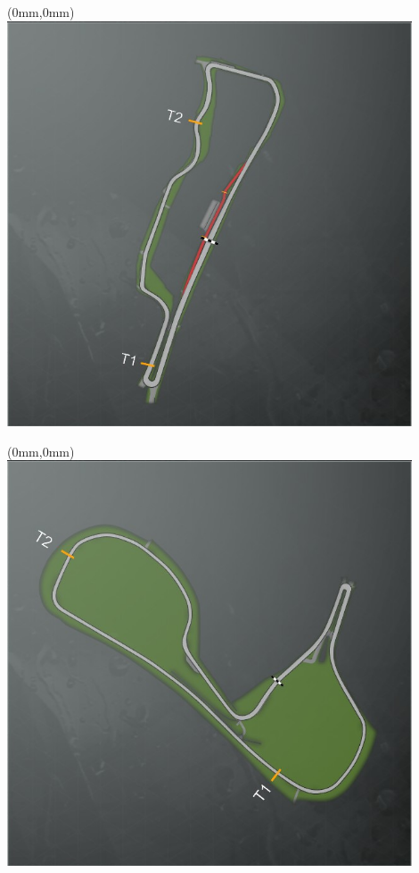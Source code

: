 \null\newpage
\begin{textblock*}{30mm}(0mm,0mm)%
\includegraphics[width=120mm]{TR/2015-05-20_00012.png}
\end{textblock*}
\null\newpage
\begin{textblock*}{30mm}(0mm,0mm)%
\includegraphics[width=120mm]{TR/2015-05-20_00011.png}
\end{textblock*}
